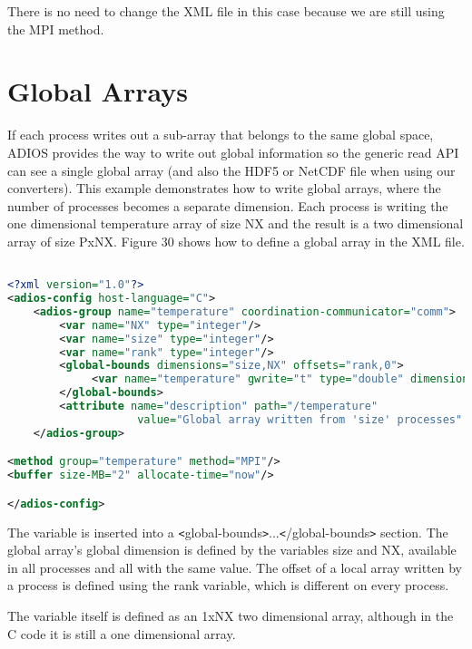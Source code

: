 There is no need to change the XML file in this case because we are still using 
the MPI method. 
\section{Global Arrays}
\label{section-cprogramming-globalarrays}

If each process writes out a sub-array that belongs to the same global space, ADIOS 
provides the way to write out global information so the generic read API can see 
a single global array (and also the HDF5 or NetCDF file when using our converters). 
This example demonstrates how to write global arrays, where the number of processes 
becomes a separate dimension. Each process is writing the one dimensional temperature 
array of size NX and the result is a two dimensional array of size PxNX. Figure 
30 shows how to define a global array in the XML file. 

\begin{lstlisting}[language=XML,caption=Config.xml for a global array 
(examples/C/global-array/adios\_global.xml]

<?xml version="1.0"?>
<adios-config host-language="C">
    <adios-group name="temperature" coordination-communicator="comm">
        <var name="NX" type="integer"/>
        <var name="size" type="integer"/>
        <var name="rank" type="integer"/>
        <global-bounds dimensions="size,NX" offsets="rank,0">
             <var name="temperature" gwrite="t" type="double" dimensions="1,NX"/>
        </global-bounds>
        <attribute name="description" path="/temperature"
                    value="Global array written from 'size' processes" type="string"/>
    </adios-group>

<method group="temperature" method="MPI"/>
<buffer size-MB="2" allocate-time="now"/>

</adios-config>
\end{lstlisting}

The variable is inserted into a \texttt{<}global-bounds\texttt{>}...\texttt{<}/global-bounds\texttt{>} 
section. The global array's global dimension is defined by the variables size and 
NX, available in all processes and all with the same value. The offset of a local 
array written by a process is defined using the rank variable, which is different 
on every process.

The variable itself is defined as an 1xNX two dimensional array, although in the 
C code it is still a one dimensional array. 

